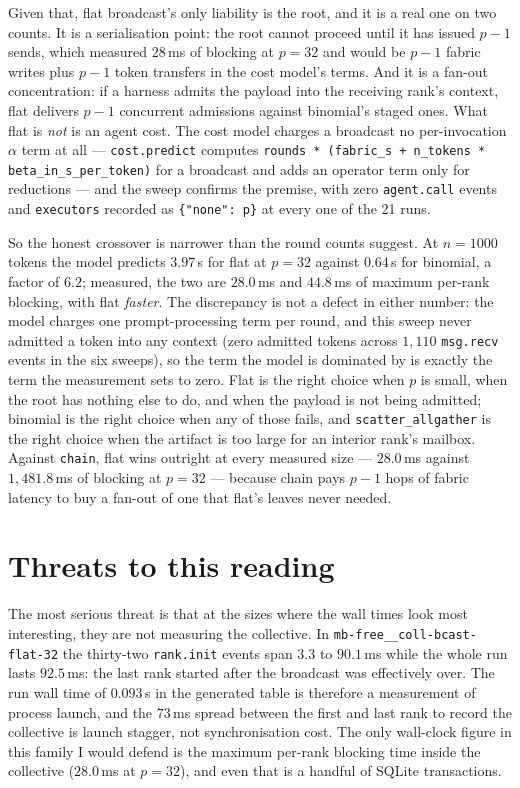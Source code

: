 \documentclass[11pt]{article}
\begin{document}
Given that, flat broadcast's only liability is the root, and it is a real one on two counts.
It is a serialisation point: the root cannot proceed until it has issued $p-1$ sends, which
measured $28$\,ms of blocking at $p=32$ and would be $p-1$ fabric writes plus $p-1$ token
transfers in the cost model's terms. And it is a fan-out concentration: if a harness admits
the payload into the receiving rank's context, flat delivers $p-1$ concurrent admissions
against binomial's staged ones. What flat is \emph{not} is an agent cost. The cost model
charges a broadcast no per-invocation $\alpha$ term at all --- \texttt{cost.predict} computes
\texttt{rounds * (fabric\_s + n\_tokens * beta\_in\_s\_per\_token)} for a broadcast and adds
an operator term only for reductions --- and the sweep confirms the premise, with zero
\texttt{agent.call} events and \texttt{executors} recorded as \texttt{\{"none": p\}} at every
one of the 21 runs.

So the honest crossover is narrower than the round counts suggest. At $n=1000$ tokens the
model predicts $3.97$\,s for flat at $p=32$ against $0.64$\,s for binomial, a factor of
$6.2$; measured, the two are $28.0$\,ms and $44.8$\,ms of maximum per-rank blocking, with
flat \emph{faster}. The discrepancy is not a defect in either number: the model charges one
prompt-processing term per round, and this sweep never admitted a token into any context
(zero admitted tokens across $1{,}110$ \texttt{msg.recv} events in the six sweeps), so the
term the model is dominated by is exactly the term the measurement sets to zero. Flat is the
right choice when $p$ is small, when the root has nothing else to do, and when the payload is
not being admitted; binomial is the right choice when any of those fails, and
\texttt{scatter\_allgather} is the right choice when the artifact is too large for an interior
rank's mailbox. Against \texttt{chain}, flat wins outright at every measured size --- $28.0$\,ms
against $1{,}481.8$\,ms of blocking at $p=32$ --- because chain pays $p-1$ hops of fabric
latency to buy a fan-out of one that flat's leaves never needed.

\section{Threats to this reading}

The most serious threat is that at the sizes where the wall times look most interesting, they
are not measuring the collective. In \texttt{mb-free\_\_coll-bcast-flat-32} the thirty-two
\texttt{rank.init} events span $3.3$ to $90.1$\,ms while the whole run lasts $92.5$\,ms: the
last rank started after the broadcast was effectively over. The run wall time of $0.093$\,s in
the generated table is therefore a measurement of process launch, and the $73$\,ms spread
between the first and last rank to record the collective is launch stagger, not
synchronisation cost. The only wall-clock figure in this family I would defend is the maximum
per-rank blocking time inside the collective ($28.0$\,ms at $p=32$), and even that is a
handful of SQLite transactions.
\end{document}
